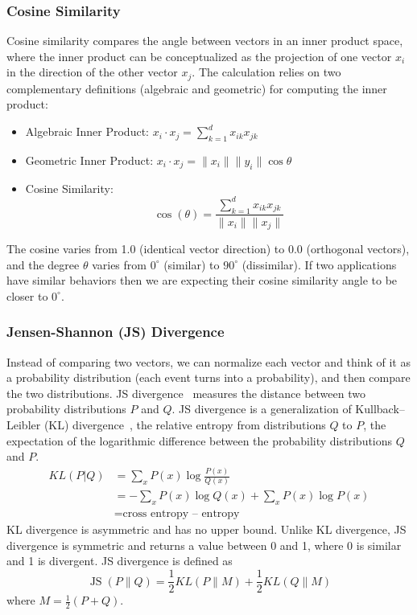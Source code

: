 \subsubsection{Cosine Similarity}
\label{sec:cos_sim}
Cosine similarity compares the angle between vectors in an inner product space, where the inner product can be conceptualized
as the projection of one vector $x_{i}$ in the direction of the other vector $x_{j}$. The calculation relies on two complementary definitions (algebraic and geometric) for computing the inner product:
\begin{itemize}
\item 
Algebraic Inner Product:
$x_{i}\cdot x_{j}=\sum_{k=1}^{d} x_{ik} x_{jk}$
\item
Geometric Inner Product:
$x_{i}\cdot x_{j}=\|x_{i}\|\|y_{i}\|\cos\theta$
\item
Cosine Similarity:
\begin{equation}
\cos(\theta)=\frac{\sum_{k=1}^{d} x_{ik} x_{jk}}{\|x_{i}\|\|x_{j}\|}
\end{equation}
\end{itemize} 
The cosine varies from 1.0 (identical vector direction) to 0.0 (orthogonal vectors), and the degree $\theta$ varies from $0^\circ$ (similar) to $90^\circ$ (dissimilar). If two applications have similar behaviors then we are expecting their cosine similarity angle to be closer to $0^\circ$.  

\subsubsection{Jensen-Shannon (JS) Divergence}
\label{sec:JS}
Instead of comparing two vectors, we can normalize each vector and think of it as a probability distribution (each event turns into a probability), and then compare the two distributions.
JS divergence~\cite{endres2003new} measures the distance between two probability distributions $P$ and $Q$. JS divergence is a generalization of  Kullback–Leibler (KL) divergence~\cite{kullback1951information}, the relative entropy from distributions $Q$ to $P$, \ie the expectation of the logarithmic difference between the probability distributions $Q$ and $P$. 
\begin{align*}
KL(P|Q)&=\sum_{x} P(x) \log \frac{P(x)}{Q(x)} \\ 
&=-\sum_{x} P(x) \log {Q(x)}+\sum_{x} P(x) \log {P(x)} \\ 
& =\textrm{cross entropy – entropy}
\end{align*}
KL divergence is asymmetric and has no upper bound. Unlike KL divergence, JS divergence is symmetric and returns a value between 0 and 1, where 0 is similar and 1 is divergent. %
JS divergence is defined as 
\begin{equation}
\operatorname{JS}(P \| Q)=\frac{1}{2} KL(P \| M)+\frac{1}{2} KL(Q \| M)
\end{equation}
where $M=\frac{1}{2}(P+Q)$.%

